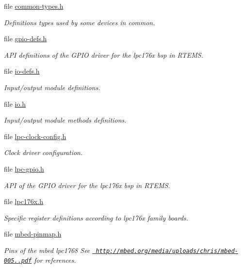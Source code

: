 \begin{DoxyCompactItemize}
file \mbox{\hyperlink{common-types_8h}{common-\/types.\+h}}
\begin{DoxyCompactList}\small\item\em Definitions types used by some devices in common. \end{DoxyCompactList}\item 
file \mbox{\hyperlink{gpio-defs_8h}{gpio-\/defs.\+h}}
\begin{DoxyCompactList}\small\item\em A\+PI definitions of the G\+P\+IO driver for the lpc176x bsp in R\+T\+E\+MS. \end{DoxyCompactList}\item 
file \mbox{\hyperlink{io-defs_8h}{io-\/defs.\+h}}
\begin{DoxyCompactList}\small\item\em Input/output module definitions. \end{DoxyCompactList}\item 
file \mbox{\hyperlink{bsps_2arm_2lpc176x_2include_2bsp_2io_8h}{io.\+h}}
\begin{DoxyCompactList}\small\item\em Input/output module methods definitions. \end{DoxyCompactList}\item 
file \mbox{\hyperlink{lpc176x_2include_2bsp_2lpc-clock-config_8h}{lpc-\/clock-\/config.\+h}}
\begin{DoxyCompactList}\small\item\em Clock driver configuration. \end{DoxyCompactList}\item 
file \mbox{\hyperlink{lpc-gpio_8h}{lpc-\/gpio.\+h}}
\begin{DoxyCompactList}\small\item\em A\+PI of the G\+P\+IO driver for the lpc176x bsp in R\+T\+E\+MS. \end{DoxyCompactList}\item 
file \mbox{\hyperlink{lpc176x_8h}{lpc176x.\+h}}
\begin{DoxyCompactList}\small\item\em Specific register definitions according to lpc176x family boards. \end{DoxyCompactList}\item 
file \mbox{\hyperlink{mbed-pinmap_8h}{mbed-\/pinmap.\+h}}
\begin{DoxyCompactList}\small\item\em Pins of the mbed lpc1768 See \href{http://mbed.org/media/uploads/chris/mbed-005.1.pdf}{\texttt{ http\+://mbed.\+org/media/uploads/chris/mbed-\/005..\+pdf}} for references. \end{DoxyCompactList}\item 

\end{DoxyCompactItemize}

